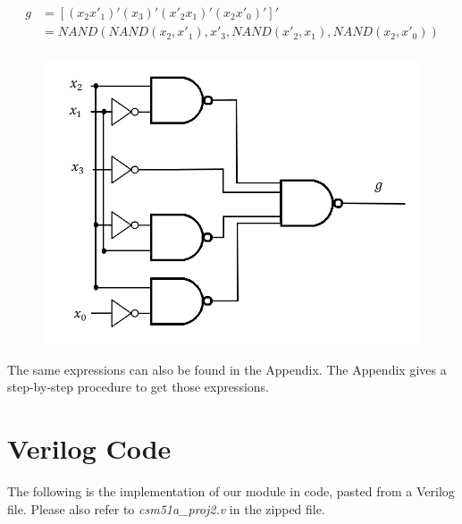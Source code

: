 \documentclass{article}
\begin{document}
\clearpage


\begin{equation*}
\begin{split}
g & = [ (x_2 x'_1)' (x_3)' (x'_2 x_1)' (x_2 x'_0)' ]' \\ 
  & = NAND(NAND(x_2, x'_1), x'_3, NAND(x'_2, x_1), NAND(x_2, x'_0)) \\
\end{split}
\end{equation*}
\begin{figure}[h!]
\centering
\includegraphics[scale=0.25]{g-NAND-NAND}
\end{figure}

The same expressions can also be found in the Appendix. The Appendix gives a 
step-by-step procedure to get those expressions.
 

\section{Verilog Code}
The following is the implementation of our module in code, pasted from a 
Verilog file. Please also refer to \textit{csm51a\_proj2.v} in the zipped 
file.\\
\end{document}
